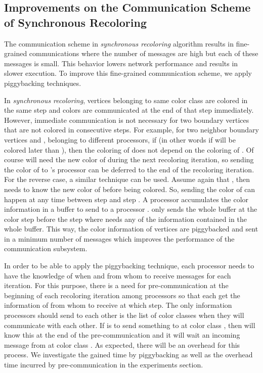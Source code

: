 \documentclass{article}
\begin{document}
\subsection{Improvements on the Communication Scheme of Synchronous Recoloring}
\label{sec:improved_comm}

The communication scheme in {\em synchronous recoloring} algorithm
results in fine-grained communications where the number of messages
are high but each of these messages is small. This behavior lowers
network performance and results in slower execution. To improve this
fine-grained communication scheme, we apply piggybacking techniques.

In {\em synchronous recoloring}, vertices belonging to same color
class are colored in the same step and colors are communicated at the
end of that step immediately. However, immediate communication is not
necessary for two boundary vertices that are not colored in
consecutive steps. For example, for two neighbor boundary vertices 
and , belonging to different processors, if  (in other words if  will be colored
later than ), then the coloring of  does not depend on the
coloring of . Of course  will need the new color of  during
the next recoloring iteration, so sending the color of  to 's
processor can be deferred to the end of the recoloring iteration.  For
the reverse case, a similar technique can be used. Assume again that
, then  needs to know
the new color of  before being colored. So, sending the color of
 can happen at any time between step  and
step .  A processor  accumulates the color
information in a buffer to send to a processor .  only
sends the whole buffer at the color step before the step where 
needs any of the information contained in the whole buffer. This way, the color
information of vertices are piggybacked and sent in a minimum number
of messages which improves the performance of the communication subsystem.

In order to be able to apply the piggybacking technique, each
processor needs to have the knowledge of when and from whom
to receive messages for each iteration. For this purpose, there is a need for
pre-communication at the beginning of each recoloring iteration among
processors so that each get the information of from whom
to receive at which step. The only information processors should
send to each other is the list of color classes when they will
communicate with each other. If  is to send something to  at
color class , then  will know this at the end of the
pre-communication and it will wait an incoming message from  at color
class . As expected, there will be an overhead for this process. We
investigate the gained time by piggybacking as well as the overhead
time incurred by pre-communication in the experiments section.
\end{document}
